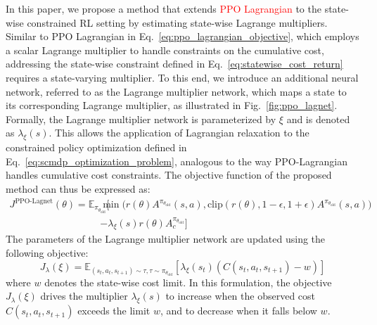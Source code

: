 In this paper, we propose a method that extends \textcolor{red}{PPO Lagrangian} to the state-wise constrained RL setting by estimating state-wise Lagrange multipliers.
Similar to PPO Lagrangian in Eq.~\ref{eq:ppo_lagrangian_objective}, which employs a scalar Lagrange multiplier to handle constraints on the cumulative cost, addressing the state-wise constraint defined in Eq.~\ref{eq:statewise_cost_return} requires a state-varying multiplier.
To this end, we introduce an additional neural network, referred to as the Lagrange multiplier network, which maps a state to its corresponding Lagrange multiplier, as illustrated in Fig.~\ref{fig:ppo_lagnet}.
Formally, the Lagrange multiplier network is parameterized by $\xi$ and is denoted as $\lambda_\xi(s)$.
This allows the application of Lagrangian relaxation to the constrained policy optimization defined in Eq.~\ref{eq:scmdp_optimization_problem}, analogous to the way PPO-Lagrangian handles cumulative cost constraints.
The objective function of the proposed method can thus be expressed as:
\begin{equation} 
    \begin{aligned} J^{\text{PPO-Lagnet}}(\theta) 
        = \mathbb{E}_{\pi_{\theta_\text{old}}} \Big[ &\min \big( r(\theta) A^{\pi_{\theta_\text{old}}}(s, a), \text{clip}(r(\theta), 1 - \epsilon, 1 + \epsilon) A^{\pi_{\theta_\text{old}}}(s, a) \big) 
        \\ &- \lambda_\xi(s) r(\theta) A^{\pi_{\theta_\text{old}}}_c \Big] 
    \end{aligned} 
\end{equation}
The parameters of the Lagrange multiplier network are updated using the following objective:
\begin{equation} \label{eq:lagrange_multiplier_update}
    J_\lambda(\xi) = \mathbb{E}_{(s_t, a_t, s_{t + 1}) \sim \tau, \tau \sim \pi_{\theta_\text{old}}} [\lambda_\xi(s_t) (C(s_t, a_t, s_{t + 1}) - w)]
\end{equation}
where $w$ denotes the state-wise cost limit. 
In this formulation, the objective $J_\lambda(\xi)$ drives the multiplier $\lambda_\xi(s)$ to increase when the observed cost $C(s_t, a_t, s_{t+1})$ exceeds the limit $w$, and to decrease when it falls below $w$.
